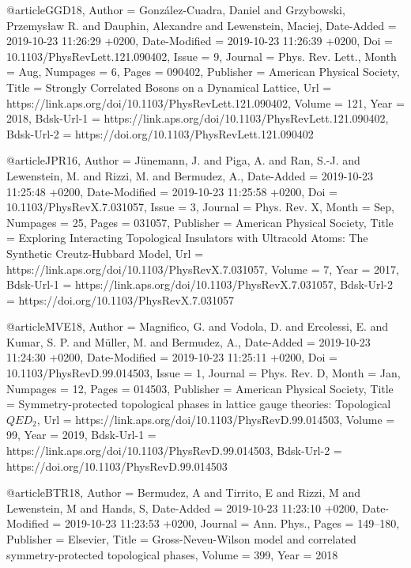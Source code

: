 \documentclass[epj,final]{svjour}
\begin{document}
@article{GGD18,
	Author = {Gonz\'alez-Cuadra, Daniel and Grzybowski, Przemys\l{}aw R. and Dauphin, Alexandre and Lewenstein, Maciej},
	Date-Added = {2019-10-23 11:26:29 +0200},
	Date-Modified = {2019-10-23 11:26:39 +0200},
	Doi = {10.1103/PhysRevLett.121.090402},
	Issue = {9},
	Journal = {Phys. Rev. Lett.},
	Month = {Aug},
	Numpages = {6},
	Pages = {090402},
	Publisher = {American Physical Society},
	Title = {Strongly Correlated Bosons on a Dynamical Lattice},
	Url = {https://link.aps.org/doi/10.1103/PhysRevLett.121.090402},
	Volume = {121},
	Year = {2018},
	Bdsk-Url-1 = {https://link.aps.org/doi/10.1103/PhysRevLett.121.090402},
	Bdsk-Url-2 = {https://doi.org/10.1103/PhysRevLett.121.090402}}

@article{JPR16,
	Author = {J\"unemann, J. and Piga, A. and Ran, S.-J. and Lewenstein, M. and Rizzi, M. and Bermudez, A.},
	Date-Added = {2019-10-23 11:25:48 +0200},
	Date-Modified = {2019-10-23 11:25:58 +0200},
	Doi = {10.1103/PhysRevX.7.031057},
	Issue = {3},
	Journal = {Phys. Rev. X},
	Month = {Sep},
	Numpages = {25},
	Pages = {031057},
	Publisher = {American Physical Society},
	Title = {Exploring Interacting Topological Insulators with Ultracold Atoms: The Synthetic Creutz-Hubbard Model},
	Url = {https://link.aps.org/doi/10.1103/PhysRevX.7.031057},
	Volume = {7},
	Year = {2017},
	Bdsk-Url-1 = {https://link.aps.org/doi/10.1103/PhysRevX.7.031057},
	Bdsk-Url-2 = {https://doi.org/10.1103/PhysRevX.7.031057}}

@article{MVE18,
	Author = {Magnifico, G. and Vodola, D. and Ercolessi, E. and Kumar, S. P. and M\"uller, M. and Bermudez, A.},
	Date-Added = {2019-10-23 11:24:30 +0200},
	Date-Modified = {2019-10-23 11:25:11 +0200},
	Doi = {10.1103/PhysRevD.99.014503},
	Issue = {1},
	Journal = {Phys. Rev. D},
	Month = {Jan},
	Numpages = {12},
	Pages = {014503},
	Publisher = {American Physical Society},
	Title = {Symmetry-protected topological phases in lattice gauge theories: Topological {$QED_{2}$}},
	Url = {https://link.aps.org/doi/10.1103/PhysRevD.99.014503},
	Volume = {99},
	Year = {2019},
	Bdsk-Url-1 = {https://link.aps.org/doi/10.1103/PhysRevD.99.014503},
	Bdsk-Url-2 = {https://doi.org/10.1103/PhysRevD.99.014503}}

@article{BTR18,
	Author = {Bermudez, A and Tirrito, E and Rizzi, M and Lewenstein, M and Hands, S},
	Date-Added = {2019-10-23 11:23:10 +0200},
	Date-Modified = {2019-10-23 11:23:53 +0200},
	Journal = {Ann. Phys.},
	Pages = {149--180},
	Publisher = {Elsevier},
	Title = {{Gross-Neveu-Wilson} model and correlated symmetry-protected topological phases},
	Volume = {399},
	Year = {2018}}
\end{document}
